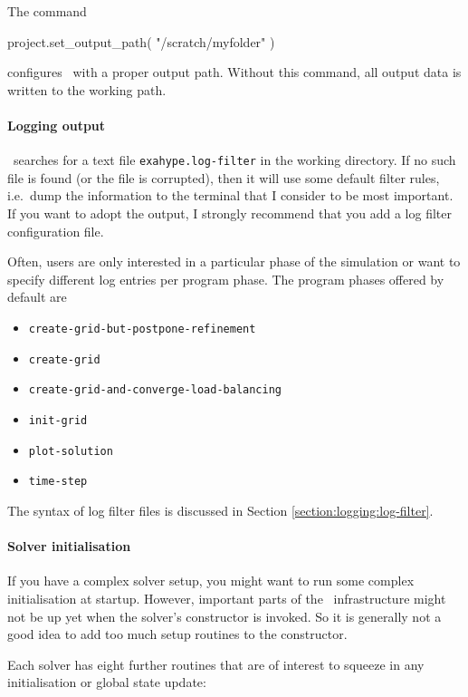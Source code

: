 The command
\begin{code}
project.set_output_path( "/scratch/myfolder" )
\end{code}
\noindent
configures \Peano\ with a proper output path. Without this command, all output
data is written to the working path.


\paragraph{Logging output}

\ExaHyPE\ searches for a text file \texttt{exahype.log-filter} in the working
directory.
If no such file is found (or the file is corrupted), then it will use some
default filter rules, i.e.~dump the information to the terminal that I consider
to be most important.
If you want to adopt the output, I strongly recommend that you add a log filter
configuration file. 


Often, users are only interested in a particular phase of the simulation or want 
to specify different log entries per program phase. The program phases offered
by default are
\begin{itemize}
  \item \texttt{create-grid-but-postpone-refinement}
  \item \texttt{create-grid}
  \item \texttt{create-grid-and-converge-load-balancing}
  \item \texttt{init-grid}
  \item \texttt{plot-solution}
  \item \texttt{time-step}
\end{itemize}

\noindent
The syntax of log filter files is discussed in Section
\ref{section:logging:log-filter}.


\paragraph{Solver initialisation}

If you have a complex solver setup, you might want to run some complex
initialisation at startup.
However, important parts of the \ExaHyPE\ infrastructure might not be up yet
when the solver's constructor is invoked.
So it is generally not a good idea to add too much setup routines to the
constructor.


Each solver has eight further routines that are of interest to squeeze in any
initialisation or global state update:

